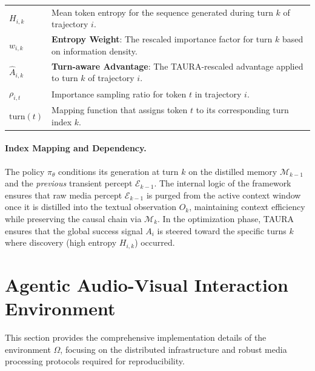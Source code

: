 \documentclass{article}
\theoremstyle{plain}
\theoremstyle{definition}
\theoremstyle{remark}
\begin{document}
\begin{table}[h]
\begin{tabularx}{\textwidth}{l X}
$H_{i,k}$ & Mean token entropy for the sequence generated during turn $k$ of trajectory $i$. \\
$w_{i,k}$ & \textbf{Entropy Weight}: The rescaled importance factor for turn $k$ based on information density. \\
$\hat{A}_{i,k}$ & \textbf{Turn-aware Advantage}: The TAURA-rescaled advantage applied to turn $k$ of trajectory $i$. \\
$\rho_{i,t}$ & Importance sampling ratio for token $t$ in trajectory $i$. \\
$\mathrm{turn}(t)$ & Mapping function that assigns token $t$ to its corresponding turn index $k$. \\
\bottomrule
\end{tabularx}
\end{table}

\paragraph{Index Mapping and Dependency.} 
The policy $\pi_\theta$ conditions its generation at turn $k$ on the distilled memory $\mathcal{M}_{k-1}$ and the \textit{previous} transient percept $\mathcal{E}_{k-1}$. The internal logic of the framework ensures that raw media percept $\mathcal{E}_{k-1}$ is purged from the active context window once it is distilled into the textual observation $O_k$, maintaining context efficiency while preserving the causal chain via $\mathcal{M}_k$. In the optimization phase, TAURA ensures that the global success signal $A_i$ is steered toward the specific turns $k$ where discovery (high entropy $H_{i,k}$) occurred.

\section{Agentic Audio-Visual Interaction Environment}
\label{app:env}

This section provides the comprehensive implementation details of the environment $\Omega$, focusing on the distributed infrastructure and robust media processing protocols required for reproducibility.
\end{document}
